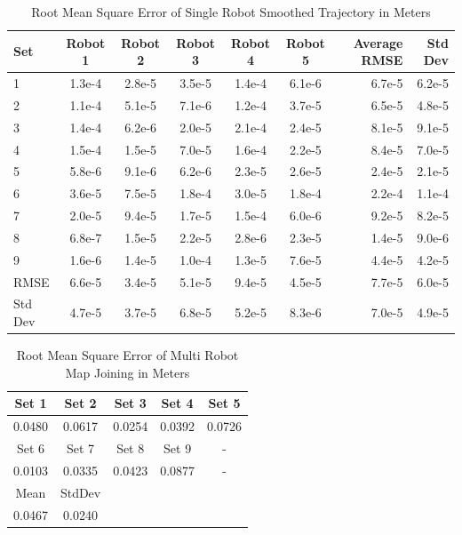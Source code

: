 \documentclass[12pt]{report}
\begin{document}
\begin{center}
\begin{table}[h]
  \caption{Root Mean Square Error of Single Robot Smoothed Trajectory
    in Meters}
  \begin{tabular}{| l | c | c | c | c | c || r ||r |}
    \hline Set & Robot 1 & Robot 2 & Robot 3 & Robot 4 & Robot 5 &
    Average RMSE & Std Dev \\ \hline \hline 1 & 1.3e-4 & 2.8e-5 &
    3.5e-5 & 1.4e-4 & 6.1e-6 & 6.7e-5 & 6.2e-5\\ \hline 2 & 1.1e-4 &
    5.1e-5 & 7.1e-6 & 1.2e-4 & 3.7e-5 & 6.5e-5 & 4.8e-5\\ \hline 3 &
    1.4e-4 & 6.2e-6 & 2.0e-5 & 2.1e-4 & 2.4e-5 & 8.1e-5 &
    9.1e-5\\ \hline 4 & 1.5e-4 & 1.5e-5 & 7.0e-5 & 1.6e-4 & 2.2e-5 &
    8.4e-5 & 7.0e-5\\ \hline 5 & 5.8e-6 & 9.1e-6 & 6.2e-6 & 2.3e-5 &
    2.6e-5 & 2.4e-5 & 2.1e-5\\ \hline 6 & 3.6e-5 & 7.5e-5 & 1.8e-4 &
    3.0e-5 & 1.8e-4 & 2.2e-4 & 1.1e-4\\ \hline 7 & 2.0e-5 & 9.4e-5 &
    1.7e-5 & 1.5e-4 & 6.0e-6 & 9.2e-5 & 8.2e-5\\ \hline 8 & 6.8e-7 &
    1.5e-5 & 2.2e-5 & 2.8e-6 & 2.3e-5 & 1.4e-5 & 9.0e-6\\ \hline 9 &
    1.6e-6 & 1.4e-5 & 1.0e-4 & 1.3e-5 & 7.6e-5 & 4.4e-5 &
    4.2e-5\\ \hline \hline RMSE & 6.6e-5 & 3.4e-5 & 5.1e-5 & 9.4e-5 &
    4.5e-5 & 7.7e-5 & 6.0e-5\\ \hline Std Dev & 4.7e-5 & 3.7e-5 &
    6.8e-5 & 5.2e-5 & 8.3e-6 & 7.0e-5 & 4.9e-5\\ \hline \hline
  \end{tabular}
  \end{table}
\end{center}

\begin{center}
\begin{table}[h]
  \caption{Root Mean Square Error of Multi Robot Map Joining in
    Meters}
  \begin{tabular}{| c | c | c | c | c | }
    \hline Set 1 & Set 2 & Set 3 & Set 4 & Set 5\\ \hline 0.0480 &
    0.0617 & 0.0254 & 0.0392 & 0.0726\\ \hline Set 6 & Set 7 & Set 8 &
    Set 9 & -\\ \hline 0.0103 & 0.0335 & 0.0423 & 0.0877 & - \\ \hline
    Mean & StdDev & & & \\ \hline 0.0467 & 0.0240 & & & \\ \hline
  \end{tabular}
  \end{table}
\end{center}
\end{document}

